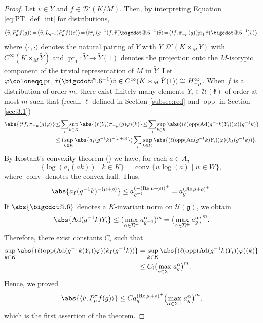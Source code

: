 \documentclass[JEP,XML,SOM,NoFloatCountersInSection,Unicode,published]{cedram}
\makeatletter
\theoremstyle{definition}
\DeclarePairedDelimiter{\abs}\lvert\rvert
\newcommand*\bigcdott{\mathpalette\bigcdot@{.6}}%
\newcommand*\bigcdot@[2]{\mathbin{\vcenter{\hbox{\scalebox{#2}{$\m@th#1\bullet$}}}}}
\newcommand{\mc}[1]{\ensuremath{\mathcal{#1}}}
\newcommand{\mf}[1]{\ensuremath{\mathfrak{#1}}}
\newcommand{\on}[1]{\ensuremath{\operatorname{#1}}}
\newcommand{\rhoa}{\ensuremath{\rho}}
\newcommand{\psts}[1]{\ensuremath{H_{#1}^\infty}}
\makeatother
\begin{document}
\begin{proof}
Let $\tilde v\in\tilde Y$ and $f\in\mc D'(K/M)$. Then, by interpreting Equation \eqref{eq:PT_def_int} for distributions,
\[
\bigl\langle\tilde v,P_\mu^\tau f(g)\bigr\rangle\!=\!\bigl\langle\tilde v,L_{g^{-1}}(P_\mu^\tau f)(e)\bigr\rangle\!=\!\bigl\langle t\pi_\mu(g^{-1})f,\tilde\tau(\bigcdott^{-1})\tilde v\bigr\rangle\!=\!\bigl\langle tf,\pi_{-\mu}(g)(\on{pr}_1\tilde\tau(\bigcdott^{-1})\tilde v)\bigr\rangle,
\]
where $\langle\cdot\,,\cdot\rangle$ denotes the natural pairing of $\tilde Y$ with $Y$ \resp $\mc D'(K\times_MY)$ with \hbox{$C^\infty(K\times_M\tilde Y)$} and $\on{pr}_1\colon\tilde Y\to\tilde Y(1)$ denotes the projection onto the $M$-isotypic component of the trivial representation of $M$ in $\tilde Y$. Let $\varphi\coloneqq\on{pr}_{1}\tilde\tau(\bigcdott^{-1})\tilde v\in C^\infty(K\times_M\tilde Y(1))\cong\psts{-\mu}$. When $f$ is a distribution of order $m$, there exist finitely many elements $Y_i\in\mc U(\mf k)$ of order at most $m$ such that (recall $\ell$ defined in Section \ref{subsec:red} and $\on{opp}$ in Section \ref{sec:3.1})
\begin{align*}
\abs{\langle tf,\pi_{-\mu}(g)\varphi\rangle}&\!\leq\!\sum_i\!\sup_{k\in K}\abs{(r(Y_i)\pi_{-\mu}(g)\varphi)(k)}\!\leq\!\sum_i\!\sup_{k\in K}\abs{(\ell(\on{opp}(\on{Ad}(g^{-1}k)Y_i))\varphi)(g^{-1}k)}\\
&\!\leq(\sup_{k\in K}\abs{a_I(g^{-1}k)^{-(\mu+\rhoa)}})\sum_i\sup_{k\in K}\abs{(\ell(\on{opp}(\on{Ad}(g^{-1}k)Y_i))\varphi)(k_I(g^{-1}k))}.
\end{align*}
By Kostant's convexity theorem (\cite[Ch.\,IV, Th.\,10.5]{GAGA}) we have, for each $a\in A$,
\[
\{\log(a_I(ak))\mid k\in K\}=\on{conv}\{w\log(a)\mid w\in W\},
\]
where $\on{conv}$ denotes the convex hull. Thus,
\[
\abs{a_I(g^{-1}k)^{-(\mu+\rhoa)}}\leq a_{g^{-1}}^{(-(\on{Re}\mu+\rhoa))^+}=a_g^{(\on{Re}\mu+\rhoa)^+}.
\]
If $\abs{\bigcdott}$ denotes a $K$-invariant norm on $\mc U(\mf g)$, we obtain
\[
\abs{\on{Ad}(g^{-1}k)Y_i}\leq (\max_{\alpha\in\Sigma^+}a_{g^{-1}}^\alpha)^m=\bigl(\max_{\alpha\in\Sigma^+}a_{g}^\alpha\bigr)^m.
\]
Therefore, there exist constants $C_i$ such that
\begin{align*}
\sup_{k\in K}\abs{(\ell(\on{opp}(\on{Ad}(g^{-1}k)Y_i))\varphi)(k_I(g^{-1}k))}&=\sup_{k\in K}\abs{(\ell(\on{opp}(\on{Ad}(g^{-1}k)Y_i))\varphi)(k)}
\\
&\leq C_i\bigl(\max_{\alpha\in\Sigma^+}a_g^\alpha\bigr)^m.
\end{align*}
Hence, we proved
\[
\abs{\langle\tilde v,P_\mu^\tau f(g)\rangle}\leq Ca_g^{(\on{Re}\mu+\rhoa)^+}\bigl(\max_{\alpha\in\Sigma^+}a_g^\alpha\bigr)^m,
\]
which is the first assertion of the theorem.


\end{proof}
\end{document}
